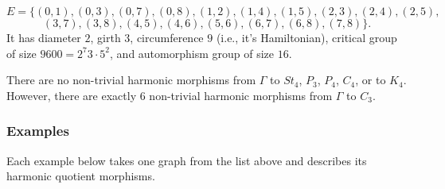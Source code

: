 \documentclass[12pt,letterpaper]{article}
\theoremstyle{definition}
\begin{document}
\begin{enumerate}
\[
E = \{
(0, 1), (0, 3), (0, 7), (0, 8), (1, 2), (1, 4), (1, 5), (2, 3), (2, 4), (2, 5),
\]
\[
(3, 7), (3, 8), (4, 5), (4, 6), (5, 6), (6, 7), (6, 8), (7, 8)
\}.
\]
It has diameter $2$,
girth $3$, circumference $9$ (i.e., it's Hamiltonian),
critical group of size $9600 = 2^7 3 \cdot 5^2$, 
and automorphism group of size $16$.

There are no non-trivial harmonic morphisms from $\Gamma$ to $St_4$,
$P_3$, $P_4$, $C_4$, or to $K_4$. However, there are
exactly $6$ non-trivial harmonic morphisms from $\Gamma$ to $C_3$.


\end{enumerate}

\subsubsection{Examples}

Each example below takes one graph from the list above and describes
its harmonic quotient morphisms.
\end{document}
